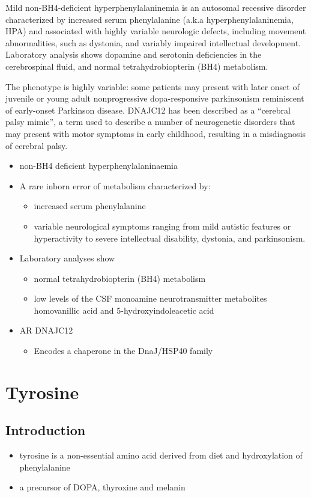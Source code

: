 \documentclass[12pt]{scrartcl}
\begin{document}
Mild non-BH4-deficient hyperphenylalaninemia is an autosomal recessive
disorder characterized by increased serum phenylalanine (a.k.a
hyperphenylalaninemia, HPA) and associated with highly variable
neurologic defects, including movement abnormalities, such as
dystonia, and variably impaired intellectual development. Laboratory
analysis shows dopamine and serotonin deficiencies in the
cerebrospinal fluid, and normal tetrahydrobiopterin (BH4) metabolism.

The phenotype is highly variable: some patients may present with later
onset of juvenile or young adult nonprogressive dopa-responsive
parkinsonism reminiscent of early-onset Parkinson disease. DNAJC12 has
been described as a “cerebral palsy mimic”, a term used to describe a
number of neurogenetic disorders that may present with motor symptoms
in early childhood, resulting in a misdiagnosis of cerebral palsy.

\begin{itemize}
\item non-BH4 deficient hyperphenylalaninaemia
\item A rare inborn error of metabolism characterized by:
\begin{itemize}
\item increased serum phenylalanine
\item variable neurological symptoms ranging from mild autistic features or hyperactivity to severe
intellectual disability, dystonia, and parkinsonism.
\end{itemize}
\item Laboratory analyses show
\begin{itemize}
\item normal tetrahydrobiopterin (BH4) metabolism
\item low levels of the CSF monoamine neurotransmitter metabolites homovanillic acid and 5-hydroxyindoleacetic acid
\end{itemize}

\item AR DNAJC12
\begin{itemize}
\item Encodes a chaperone in the DnaJ/HSP40 family
\end{itemize}
\end{itemize}

\section{Tyrosine}
\label{sec:org6415dce}
\subsection{Introduction}
\label{sec:orgbf04b6e}
\begin{itemize}
\item tyrosine is a non-essential amino acid derived from diet and hydroxylation of phenylalanine
\item a precursor of DOPA, thyroxine and melanin
\end{itemize}
\end{document}
